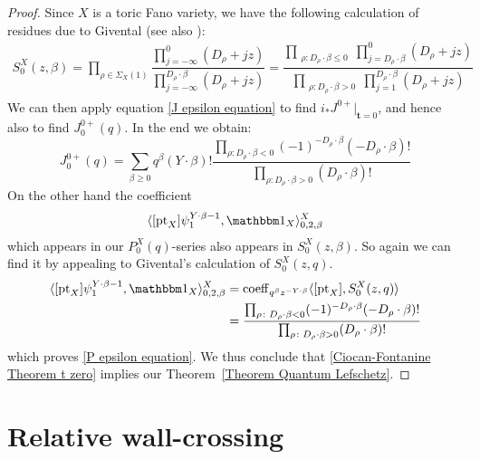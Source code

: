 \documentclass[10pt]{amsart}
\newcommand{\pt}{\operatorname{pt}}
\theoremstyle{definition}
\theoremstyle{definition}
\begin{document}
\begin{proof}
Since $X$ is a toric Fano variety, we have the following calculation of residues due to Givental \cite{Givental-mirror} (see also \cite[Definition 7.2.8]{CF-K}):
\begin{align*}
S_0^X(z,\beta) =\prod_{\rho\in\Sigma_X(1)}\dfrac{\prod_{j=-\infty}^0(D_{\rho}+jz)}{\prod_{j=-\infty}^{D_{\rho}\cdot \beta}(D_\rho+jz)}
=\dfrac{\prod_{\substack{\rho \colon D_\rho \cdot \beta\leq 0}} \prod_{j=D_\rho \cdot \beta}^0 (D_{\rho}+jz)}{\prod_{\substack{\rho\colon D_\rho \cdot\beta > 0}} \prod_{j=1}^{D_\rho\cdot\beta} (D_{\rho}+jz)}
\end{align*}
We can then apply equation \eqref{J epsilon equation} to find $i_*J^{0+}|_{\mathbf{t}=0}$, and hence also to find $J^{0+}_0(q)$. In the end we obtain:
\begin{equation*}
 J^{0+}_0(q)=\sum_{\beta\geq 0}q^\beta(Y\cdot\beta)!\frac{\prod_{\rho\colon D_\rho\cdot\beta< 0}(-1)^{-D_{\rho}\cdot\beta}(-D_{\rho}\cdot\beta)!}{\prod_{\rho\colon D_\rho\cdot\beta> 0}(D_{\rho}\cdot\beta)!}
\end{equation*}
On the other hand the coefficient
\begin{equation*} \langle[\pt_X]\psi_1^{Y\cdot\beta-1},\mathbbm 1_X\rangle_{0,2,\beta}^X\end{equation*}
which appears in our $P_0^X(q)$-series also appears in $S_0^X(z,\beta)$. So again we can find it by appealing to Givental's calculation of $S_0^X(z,q)$.
\begin{align*}
 \langle[\pt_X]\psi_1^{Y\cdot\beta-1},\mathbbm 1_X\rangle_{0,2,\beta}^X &=\operatorname{coeff}_{q^\beta z^{-Y\cdot\beta}}\langle [\pt_X],S_0^X(z,q) \rangle\\
& =\frac{\prod_{\rho\colon D_\rho\cdot\beta< 0}(-1)^{-D_{\rho}\cdot\beta}(-D_{\rho}\cdot\beta)!}{\prod_{\rho\colon D_\rho\cdot\beta> 0}(D_{\rho}\cdot\beta)!}
\end{align*}
which proves \eqref{P epsilon equation}. We thus conclude that \eqref{Ciocan-Fontanine Theorem t zero} implies our Theorem~\ref{Theorem Quantum Lefschetz}. \end{proof}

\section{Relative wall-crossing}\label{section wallcrossing}
\end{document}
